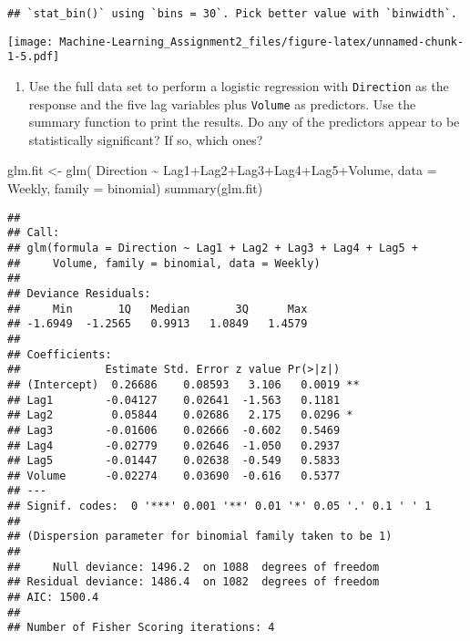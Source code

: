 \documentclass[
]{article}
\newenvironment{Shaded}{\begin{snugshade}}{\end{snugshade}}
\newcommand{\AttributeTok}[1]{\textcolor[rgb]{0.77,0.63,0.00}{#1}}
\newcommand{\FunctionTok}[1]{\textcolor[rgb]{0.00,0.00,0.00}{#1}}
\newcommand{\NormalTok}[1]{#1}
\newcommand{\OtherTok}[1]{\textcolor[rgb]{0.56,0.35,0.01}{#1}}
\newcommand{\SpecialCharTok}[1]{\textcolor[rgb]{0.00,0.00,0.00}{#1}}
\providecommand{\tightlist}{%
  \setlength{\itemsep}{0pt}\setlength{\parskip}{0pt}}
\begin{document}
\begin{verbatim}
## `stat_bin()` using `bins = 30`. Pick better value with `binwidth`.
\end{verbatim}

\texttt{[image: Machine-Learning\_Assignment2\_files/figure-latex/unnamed-chunk-1-5.pdf]}

\begin{enumerate}
\def\labelenumi{\arabic{enumi}.}
\setcounter{enumi}{1}
\tightlist
\item
  Use the full data set to perform a logistic regression with
  \texttt{Direction} as the response and the five lag variables plus
  \texttt{Volume} as predictors. Use the summary function to print the
  results. Do any of the predictors appear to be statistically
  significant? If so, which ones?
\end{enumerate}

\begin{Shaded}
\begin{Highlighting}[]
\NormalTok{glm.fit }\OtherTok{\textless{}{-}} \FunctionTok{glm}\NormalTok{(}
\NormalTok{    Direction }\SpecialCharTok{\textasciitilde{}}\NormalTok{ Lag1}\SpecialCharTok{+}\NormalTok{Lag2}\SpecialCharTok{+}\NormalTok{Lag3}\SpecialCharTok{+}\NormalTok{Lag4}\SpecialCharTok{+}\NormalTok{Lag5}\SpecialCharTok{+}\NormalTok{Volume,}
    \AttributeTok{data =}\NormalTok{ Weekly, }\AttributeTok{family =}\NormalTok{ binomial)}
\FunctionTok{summary}\NormalTok{(glm.fit)}
\end{Highlighting}
\end{Shaded}

\begin{verbatim}
## 
## Call:
## glm(formula = Direction ~ Lag1 + Lag2 + Lag3 + Lag4 + Lag5 + 
##     Volume, family = binomial, data = Weekly)
## 
## Deviance Residuals: 
##     Min       1Q   Median       3Q      Max  
## -1.6949  -1.2565   0.9913   1.0849   1.4579  
## 
## Coefficients:
##             Estimate Std. Error z value Pr(>|z|)   
## (Intercept)  0.26686    0.08593   3.106   0.0019 **
## Lag1        -0.04127    0.02641  -1.563   0.1181   
## Lag2         0.05844    0.02686   2.175   0.0296 * 
## Lag3        -0.01606    0.02666  -0.602   0.5469   
## Lag4        -0.02779    0.02646  -1.050   0.2937   
## Lag5        -0.01447    0.02638  -0.549   0.5833   
## Volume      -0.02274    0.03690  -0.616   0.5377   
## ---
## Signif. codes:  0 '***' 0.001 '**' 0.01 '*' 0.05 '.' 0.1 ' ' 1
## 
## (Dispersion parameter for binomial family taken to be 1)
## 
##     Null deviance: 1496.2  on 1088  degrees of freedom
## Residual deviance: 1486.4  on 1082  degrees of freedom
## AIC: 1500.4
## 
## Number of Fisher Scoring iterations: 4
\end{verbatim}
\end{document}
